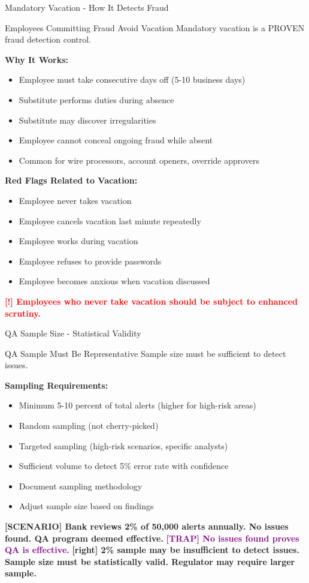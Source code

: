 \documentclass[11pt,a4paper]{beamer}
\newcommand{\redflag}[1]{\textcolor{red}{\textbf{[!] #1}}}
\newcommand{\trap}[1]{\textcolor{purple}{\textbf{[TRAP] #1}}}
\newcommand{\correct}[1]{\textcolor{green!50!black}{\textbf{[right] #1}}}
\newcommand{\scenario}[1]{\textcolor{blue!70!black}{\textbf{[SCENARIO] #1}}}
\begin{document}
\begin{frame}{Mandatory Vacation - How It Detects Fraud}
\begin{block}{Employees Committing Fraud Avoid Vacation}
Mandatory vacation is a PROVEN fraud detection control.
\end{block}
\textbf{Why It Works:}
\begin{itemize}
\item Employee must take consecutive days off (5-10 business days)
\item Substitute performs duties during absence
\item Substitute may discover irregularities
\item Employee cannot conceal ongoing fraud while absent
\item Common for wire processors, account openers, override approvers
\end{itemize}
\textbf{Red Flags Related to Vacation:}
\begin{itemize}
\item Employee never takes vacation
\item Employee cancels vacation last minute repeatedly
\item Employee works during vacation
\item Employee refuses to provide passwords
\item Employee becomes anxious when vacation discussed
\end{itemize}
\redflag{Employees who never take vacation should be subject to enhanced scrutiny.}
\end{frame}


\begin{frame}{QA Sample Size - Statistical Validity}
\begin{block}{QA Sample Must Be Representative}
Sample size must be sufficient to detect issues.
\end{block}
\textbf{Sampling Requirements:}
\begin{itemize}
\item Minimum 5-10 percent of total alerts (higher for high-risk areas)
\item Random sampling (not cherry-picked)
\item Targeted sampling (high-risk scenarios, specific analysts)
\item Sufficient volume to detect 5\% error rate with confidence
\item Document sampling methodology
\item Adjust sample size based on findings
\end{itemize}
\scenario{Bank reviews 2\% of 50,000 alerts annually. No issues found. QA program deemed effective.}
\trap{No issues found proves QA is effective.}
\correct{2\% sample may be insufficient to detect issues. Sample size must be statistically valid. Regulator may require larger sample.}
\end{frame}
\end{document}
